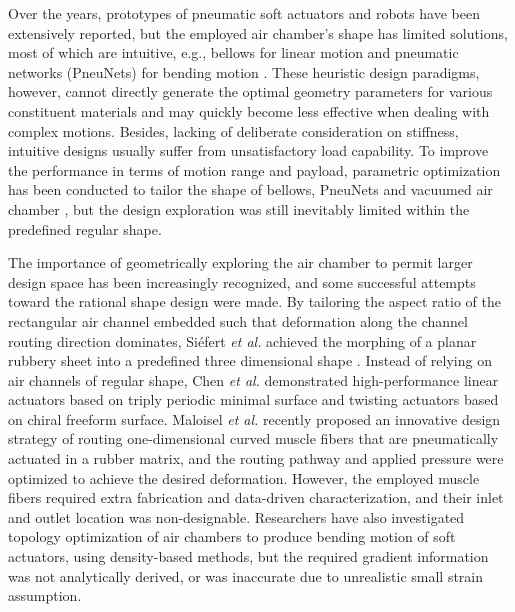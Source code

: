 \documentclass[journal]{IEEEtran}
\theoremstyle{definition}
\begin{document}
Over the years, prototypes of pneumatic soft actuators and robots have been extensively reported, but the employed air chamber's shape has limited solutions, most of which are intuitive, e.g., bellows for linear motion\cite{hashem2020design} and pneumatic networks (PneuNets) for bending motion \cite{mosadegh2014}. These heuristic design paradigms, however, cannot directly generate the optimal geometry parameters for various constituent materials and may quickly become less effective when dealing with complex motions. Besides, lacking of deliberate consideration on stiffness, intuitive designs usually suffer from unsatisfactory load capability. To improve the performance in terms of motion range and payload, parametric optimization has been conducted to tailor the shape of bellows\cite{dammer2018design}, PneuNets\cite{gu2021analytical, jiang2021modeling} and vacuumed air chamber \cite{guo2020chamber}, but the design exploration was still inevitably limited within the predefined regular shape.

The importance of geometrically exploring the air chamber to permit larger design space has been increasingly recognized, and some successful attempts toward the rational shape design were made\cite{chen2020design}. By tailoring the aspect ratio of the rectangular air channel embedded such that deformation along the channel routing direction dominates, Si{\'e}fert \textit{et al.} achieved the morphing of a planar rubbery sheet into a predefined three dimensional shape \cite{siefert2019bio}. Instead of relying on air channels of regular shape, Chen \textit{et al.} demonstrated high-performance linear actuators based on triply periodic minimal surface \cite{chen2022triply} and twisting actuators based on chiral freeform surface\cite{chen2021soft}. Maloisel \textit{et al.}  recently proposed an innovative design strategy of routing one-dimensional curved muscle fibers that are pneumatically actuated in a rubber matrix, and the routing pathway and applied pressure were optimized to achieve the desired deformation\cite{maloisel2021automated}. However, the employed muscle fibers required extra fabrication and data-driven characterization, and their inlet and outlet location was non-designable. Researchers have also investigated topology optimization of air chambers to produce bending motion of soft actuators, using density-based methods, but the required gradient information was not analytically derived\cite{caasenbrood2020computational}, or was inaccurate due to unrealistic small strain assumption\cite{chen2019optimal}.
\end{document}
